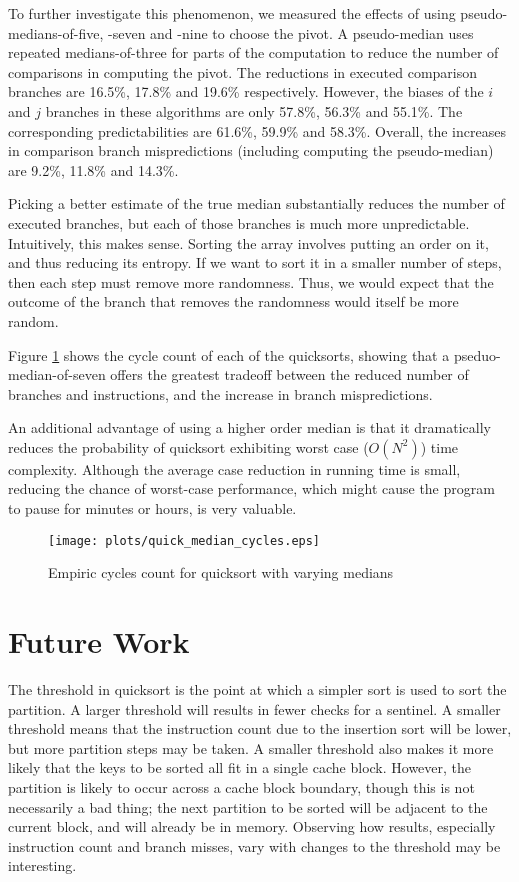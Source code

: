 To further investigate this phenomenon, we measured the effects of using
pseudo-medians-of-five, -seven and -nine to choose the pivot. A pseudo-median
uses repeated medians-of-three for parts of the computation to reduce the number
of comparisons in computing the pivot. The reductions in executed comparison
branches are 16.5\%, 17.8\% and 19.6\% respectively. However, the biases of the
$i$ and $j$ branches in these algorithms are only 57.8\%, 56.3\% and 55.1\%. The
corresponding predictabilities are 61.6\%, 59.9\% and 58.3\%. Overall, the
increases in comparison branch mispredictions (including computing the
pseudo-median) are 9.2\%, 11.8\% and 14.3\%. 

Picking a better estimate of the true median substantially reduces the number of
executed branches, but each of those branches is much more unpredictable.
Intuitively, this makes sense. Sorting the array involves putting an order on
it, and thus reducing its entropy. If we want to sort it in a smaller number of
steps, then each step must remove more randomness. Thus, we would expect that
the outcome of the branch that removes the randomness would itself be more
random.

Figure \ref{quick_median_cycles} shows the cycle count of each of the
quicksorts, showing that a pseduo-median-of-seven offers the greatest tradeoff
between the reduced number of branches and instructions, and the increase in
branch mispredictions.

An additional advantage of using a higher order median is that it dramatically
reduces the probability of quicksort exhibiting worst case ($O(N^2)$) time
complexity. Although the average case reduction in running time is small,
reducing the chance of worst-case performance, which might cause the program to
pause for minutes or hours, is very valuable.

\begin{figure}
\texttt{[image: plots/quick\_median\_cycles.eps]}
\caption{Empiric cycles count for quicksort with varying medians}
\label{quick_median_cycles}
\end{figure}


\section{Future Work}
The threshold in quicksort is the point at which a simpler sort is used to sort
the partition. A larger threshold will results in fewer checks for a sentinel. A
smaller threshold means that the instruction count due to the insertion sort
will be lower, but more partition steps may be taken. A smaller threshold also
makes it more likely that the keys to be sorted all fit in a single cache
block. However, the partition is likely to occur across a cache block boundary,
though this is not necessarily a bad thing; the next partition to be sorted will
be adjacent to the current block, and will already be in memory. Observing how
results, especially instruction count and branch misses, vary with changes 
to the threshold may be interesting.

